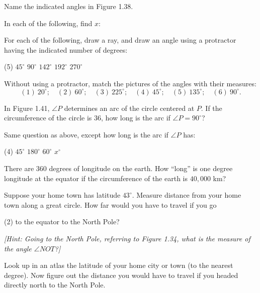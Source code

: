 \documentclass[12pt]{book} %
\begin{document}
\begin{ExerciseList}
	\Exercise Name the indicated angles in Figure 1.38.
	
	
	\Exercise In each of the following, find $x$:
	
	
	\Exercise For each of the following, draw a ray, and draw an angle using a protractor having the indicated number of degrees:
	\begin{tasks}(5)
		\task[(a)] $45^\circ$
		\task[(b)] $90^\circ$
		\task[(c)] $142^\circ$
		\task[(d)] $192^\circ$
		\task[(e)] $270^\circ$
	\end{tasks}
	
	\Exercise Without using a protractor, match the pictures of the angles with their measures:
	\[
	(1)\ 20^\circ;\quad (2)\ 60^\circ;\quad (3)\ 225^\circ;\quad (4)\ 45^\circ;\quad (5)\ 135^\circ;\quad (6)\ 90^\circ.
	\]
	
	
	\Exercise In Figure 1.41, $\angle P$ determines an arc of the circle centered at $P$. If the circumference of the circle is $36$, how long is the arc if $\angle P=90^\circ$?
	
	
	\Exercise Same question as above, except how long is the arc if $\angle P$ has:
	\begin{tasks}(4)
		\task[(a)] $45^\circ$
		\task[(b)] $180^\circ$
		\task[(c)] $60^\circ$
		\task[(d)] $x^\circ$
	\end{tasks}
	
	\Exercise There are 360 degrees of longitude on the earth. How ``long'' is one degree longitude at the equator if the circumference of the earth is $40{,}000$ km?
	
	\Exercise Suppose your home town has latitude $43^\circ$. Measure distance from your home town along a great circle. How far would you have to travel if you go
	\begin{tasks}(2)
		\task[(a)] to the equator
		\task[(b)] to the North Pole?
	\end{tasks}
	\textit{[Hint: Going to the North Pole, referring to Figure 1.34, what is the measure of the angle $\angle NOT$?]}
	
	\Exercise Look up in an atlas the latitude of your home city or town (to the nearest degree). Now figure out the distance you would have to travel if you headed directly north to the North Pole.
	

\end{ExerciseList}
\end{document}
